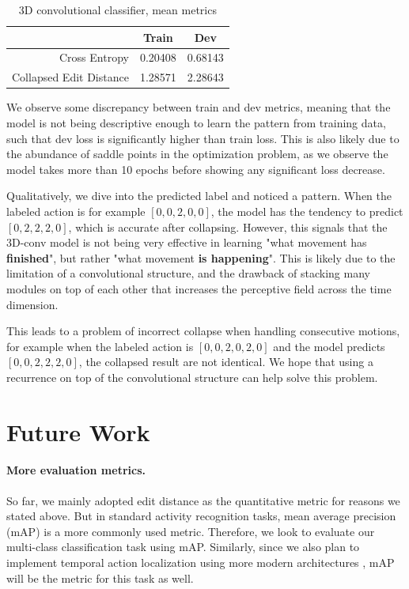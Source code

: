 \documentclass[10pt,twocolumn,letterpaper]{article}
\begin{document}
\begin{table}[]
\centering
\caption{3D convolutional classifier, mean metrics}
\label{tab:best-model-stats}
\begin{tabular}{rcc}
\hline
\multicolumn{1}{c}{}    & Train   & Dev     \\ \hline
Cross Entropy           & 0.20408 & 0.68143 \\
Collapsed Edit Distance & 1.28571 & 2.28643 \\ \hline
\end{tabular}
\end{table}

We observe some discrepancy between train and dev metrics, meaning that the model is not being descriptive enough to learn the pattern from training data, such that dev loss is significantly higher than train loss. This is also likely due to the abundance of saddle points in the optimization problem, as we observe the model takes more than 10 epochs before showing any significant loss decrease.

Qualitatively, we dive into the predicted label and noticed a pattern. When the labeled action is for example $[0,0,2,0,0]$, the model has the tendency to predict $[0,2,2,2,0]$, which is accurate after collapsing. However, this signals that the 3D-conv model is not being very effective in learning "what movement has \textbf{finished}", but rather "what movement \textbf{is happening}". This is likely due to the limitation of a convolutional structure, and the drawback of stacking many modules on top of each other that increases the perceptive field across the time dimension.

This leads to a problem of incorrect collapse when handling consecutive motions, for example when the labeled action is $[0,0,2,0,2,0]$ and the model predicts $[0,0,2,2,2,0]$, the collapsed result are not identical. We hope that using a recurrence on top of the convolutional structure can help solve this problem.

\section{Future Work}

\paragraph{More evaluation metrics.} So far, we mainly adopted edit distance as the quantitative metric for reasons we stated above. But in standard activity recognition tasks, mean average precision (mAP) is a more commonly used metric. Therefore, we look to evaluate our multi-class classification task using mAP. Similarly, since we also plan to implement temporal action localization using more modern architectures \cite{ss-tad, g-tad}, mAP will be the metric for this task as well.
\end{document}
